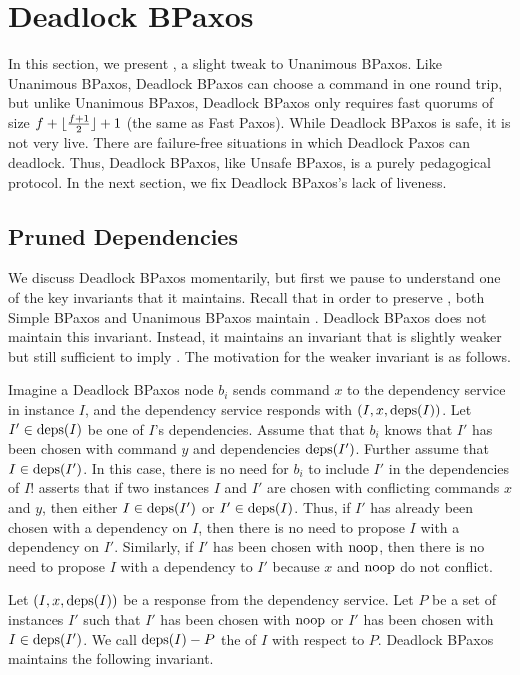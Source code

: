 \section{Deadlock BPaxos}
In this section, we present , a slight tweak to
Unanimous BPaxos. Like Unanimous BPaxos, Deadlock BPaxos can choose a command
in one round trip, but unlike Unanimous BPaxos, Deadlock BPaxos only requires
fast quorums of size $f + \lfloor\frac{f + 1}{2}\rfloor + 1$ (the same as Fast Paxos).
%
While Deadlock BPaxos is safe, it is not very live. There are failure-free
situations in which Deadlock Paxos can deadlock. Thus, Deadlock BPaxos, like
Unsafe BPaxos, is a purely pedagogical protocol. In the next section, we fix
Deadlock BPaxos's lack of liveness.

\subsection{Pruned Dependencies}
We discuss Deadlock BPaxos momentarily, but first we pause to understand one of
the key invariants that it maintains. Recall that in order to preserve
, both Simple BPaxos and Unanimous BPaxos maintain
.
%
Deadlock BPaxos does not maintain this invariant. Instead, it maintains an
invariant that is slightly weaker but still sufficient to imply
. The motivation for the weaker invariant is as
follows.

Imagine a Deadlock BPaxos node $b_i$ sends command $x$ to the dependency
service in instance $I$, and the dependency service responds with $(I, x,
\text{deps}(I))$. Let $I' \in \text{deps}(I)$ be one of $I$'s dependencies. Assume that
that $b_i$ knows that $I'$ has been chosen with command $y$ and dependencies
$\text{deps}(I')$. Further assume that $I \in \text{deps}(I')$. In this case, there is no
need for $b_i$ to include $I'$ in the dependencies of $I$!
 asserts that if two instances $I$ and $I'$ are
chosen with conflicting commands $x$ and $y$, then either $I \in \text{deps}(I')$ or
$I' \in \text{deps}(I)$. Thus, if $I'$ has already been chosen with a dependency on
$I$, then there is no need to propose $I$ with a dependency on $I'$.
%
Similarly, if $I'$ has been chosen with $\text{noop}$, then there is no need to
propose $I$ with a dependency to $I'$ because $x$ and $\text{noop}$ do not conflict.

Let $(I, x, \text{deps}(I))$ be a response from the dependency service. Let $P$ be a
set of instances $I'$ such that $I'$ has been chosen with $\text{noop}$ or $I'$ has
been chosen with $I \in \text{deps}(I')$. We call $\text{deps}(I) - P$ the  of $I$ with respect to $P$. Deadlock BPaxos maintains the
following invariant.


